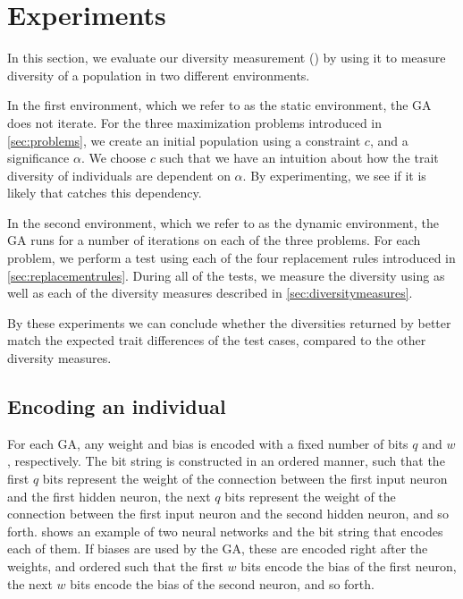 \section{Experiments}\label{sec:experiments}
In this section, we evaluate our diversity measurement (\dia) by using it to measure diversity of a population in two different environments.

In the first environment, which we refer to as the static environment, the GA does not iterate.
For the three maximization problems introduced in \cref{sec:problems}, we create an initial population using a constraint $c$, and a significance $\alpha$. We choose $c$ such that we have an intuition about how the trait diversity of individuals are dependent on $\alpha$. By experimenting, we see if it is likely that \dia{} catches this dependency.

In the second environment, which we refer to as the dynamic environment, the GA runs for a number of iterations on each of the three problems. 
For each problem, we perform a test using each of the four replacement rules introduced in \cref{sec:replacementrules}.
During all of the tests, we measure the diversity using \dia{} as well as each of the diversity measures described in \cref{sec:diversitymeasures}.

By these experiments we can conclude whether the diversities returned by \dia{} better match the expected trait differences of the test cases, compared to the other diversity measures.

\subsection{Encoding an individual}
For each GA, any weight and bias is encoded with a fixed number of bits $q$ and $w$, respectively. The bit string is constructed in an ordered manner, such that the first $q$ bits represent the weight of the connection between the first input neuron and the first hidden neuron, the next $q$ bits represent the weight of the connection between the first input neuron and the second hidden neuron, and so forth.  shows an example of two neural networks and the bit string that encodes each of them. If biases are used by the GA, these are encoded right after the weights, and ordered such that the first $w$ bits encode the bias of the first neuron, the next $w$ bits encode the bias of the second neuron, and so forth. 

